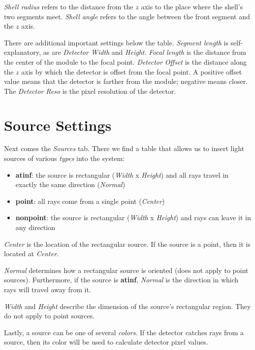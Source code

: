 \documentclass[12pt]{article}
\begin{document}
\textit{Shell radius} refers to the distance from the $z$ axis to the place where the shell's two segments meet. \textit{Shell angle} refers to the angle between the front segment and the $z$ axis.

There are additional important settings below the table. \textit{Segment length} is self-explanatory, as are \textit{Detector Width} and \textit{Height}. \textit{Focal length} is the distance from the center of the module to the focal point. \textit{Detector Offset} is the distance along the $z$ axis by which the detector is offset from the focal point. A positive offset value means that the detector is farther from the module; negative means closer. The \textit{Detector Reso} is the pixel resolution of the detector.


\section*{Source Settings}

Next comes the \textit{Sources} tab. There we find a table that allows us to insert light sources of various \textit{types} into the system:
\begin{itemize}
\item \textbf{atinf}: the source is rectangular (\textit{Width} x \textit{Height}) and all rays travel in exactly the same direction (\textit{Normal})
\item \textbf{point}: all rays come from a single point (\textit{Center})
\item \textbf{nonpoint}: the source is rectangular (\textit{Width} x \textit{Height}) and rays can leave it in any direction
\end{itemize}

\textit{Center} is the location of the rectangular source. If the source is a point, then it is located at \textit{Center}. 

\textit{Normal} determines how a rectangular source is oriented (does not apply to point sources). Furthermore, if the source is \textbf{atinf}, \textit{Normal} is the direction in which rays will travel away from it.

\textit{Width} and \textit{Height} describe the dimension of the source's rectangular region. They do not apply to point sources.

Lastly, a source can be one of several \textit{colors}. If the detector catches rays from a source, then its color will be used to calculate detector pixel values.
\end{document}
